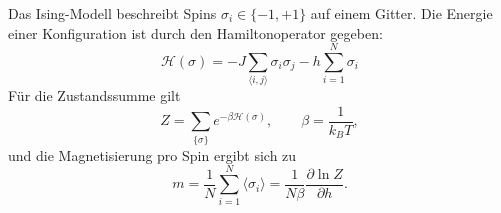 \documentclass[varwidth=14cm,border=4pt]{standalone}
\begin{document}
Das Ising-Modell beschreibt Spins $\sigma_i \in \{-1, +1\}$ auf einem Gitter.
Die Energie einer Konfiguration ist durch den Hamiltonoperator gegeben:
\[
  \mathcal{H}(\sigma) = -J \sum_{\langle i,j \rangle} \sigma_i \sigma_j - h \sum_{i=1}^{N} \sigma_i
\]
Für die Zustandssumme gilt
\[
  Z = \sum_{\{\sigma\}} e^{-\beta \mathcal{H}(\sigma)}, \qquad \beta = \frac{1}{k_B T},
\]
und die Magnetisierung pro Spin ergibt sich zu
\[
  m = \frac{1}{N} \sum_{i=1}^{N} \langle \sigma_i \rangle
    = \frac{1}{N\beta} \frac{\partial \ln Z}{\partial h}.
\]
\end{document}
